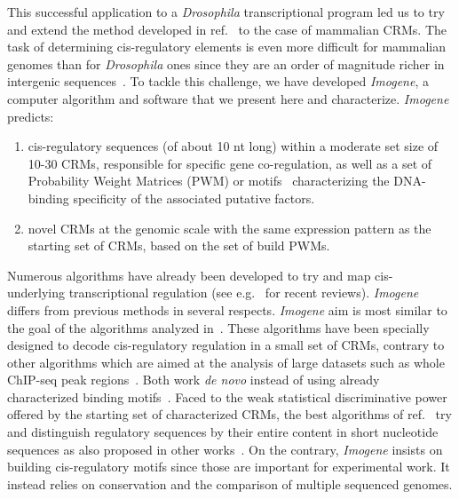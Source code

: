 \documentclass[a4,center,fleqn]{NAR}
\begin{document}
This successful application to a {\em Drosophila} transcriptional program led
us to try and extend the method developed in ref.~\cite{Rouault:2010fk}
to the case of mammalian CRMs.
The task of determining cis-regulatory elements is even more difficult for
mammalian genomes  than for  {\em Drosophila} ones since they are an order of
magnitude richer in intergenic
sequences~\cite{Flicek2012fk,clark2007evolution}.
To tackle this challenge, we have developed {\em Imogene}, a computer algorithm
and software that we present here and characterize.
{\em Imogene} predicts:
\begin{enumerate}
\item  cis-regulatory sequences (of about 10 nt long) within a moderate set
  size  of 10-30 CRMs, responsible for specific gene co-regulation, as well as
  a set of Probability Weight Matrices (PWM) or
  motifs~\cite{pmid15131651,stormo1998specificity} characterizing the
  DNA-binding specificity of the associated putative factors.
\item novel CRMs at the genomic scale with the same expression pattern as the
  starting set of CRMs, based on the set of build PWMs.
\end{enumerate}

Numerous algorithms have already been developed to try and map cis- underlying
transcriptional regulation (see
e.g.~\cite{pmid22705667,pmid21152003,pmid17053094,pmid15131651,pmid22305161}
for recent reviews).
{\em Imogene} differs from previous methods in several respects.
{\em Imogene} aim is most similar to the goal of the algorithms analyzed
in~\cite{kantorovitz2009motif}. 
These algorithms have been specially designed to decode cis-regulatory
regulation in a small set of CRMs,  contrary to  other algorithms which are
aimed at the analysis of large datasets such as whole ChIP-seq peak
regions~\cite{pmid21486936}.
Both work {\em de novo} instead of using already characterized binding
motifs~\cite{berman2002exploiting, halfon2002computation,
  rebeiz2002score,schroeder2004transcriptional, Moses:2004vn,
  siddharthan2005phylogibbs, hallikas2006genome, pierstorff2006identifying,
Herrmann2012uq}.
Faced to the weak statistical discriminative power offered by the starting set
of characterized CRMs, the best algorithms of ref.~\cite{kantorovitz2009motif}
try and distinguish regulatory sequences by their entire content in short
nucleotide sequences as also proposed in other
works~\cite{nazina2003statistical, abnizova2005some, chan2005using,
leung2009identifying, Brody:2012pd}.
On the contrary, {\em Imogene} insists on building cis-regulatory motifs since
those are important for experimental work.
It instead relies on conservation and the comparison of multiple sequenced
genomes.
\end{document}
